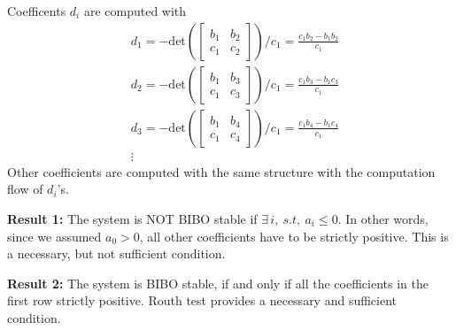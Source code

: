 \documentclass[twoside]{article}
\begin{document}
Coefficents $d_i$ are computed with
%
\begin{align*}
& d_1 = - \mathrm{det}\left( \left[ \begin{array}{cc} b_1 & b_2 \\ 
                                      c_1 & c_2 \end{array}
                                                           \right]
                                                           \right) /c_1
=
\frac{c_1 b_2 - b_1 b_2 }{c_1}
\\
&d_2 = - \mathrm{det}\left( \left[ \begin{array}{cc} b_1 & b_3 \\ c_1
                                                         &
                                                           c_3 \end{array}
                                                           \right]
                                                           \right) / c_1
=
\frac{c_1 b_3 - b_1 c_3 }{c_1}
\\
&d_3 = - \mathrm{det}\left( \left[ \begin{array}{cc} b_1 & b_4 \\ c_1
                                                         &
                                                           c_4 \end{array}
                                                           \right]
                                                           \right) / c_1
=
\frac{c_1 b_4 - b_1 c_4 }{c_1}
\\
&\vdots
\end{align*}  
%
Other coefficients are computed with the same structure with the
computation flow of $d_i$'s. 

\textbf{Result 1:} The system is NOT BIBO stable if $\exists \, i , \ s.t ,\
a_i \leq 0 $. In other words, since we assumed $a_0 > 0$, all other
coefficients have to be strictly positive. This is a necessary, but
not sufficient condition. 

\textbf{Result 2:} The system is BIBO stable, if and only if all the 
coefficients in the first row strictly positive. Routh test provides
a necessary and sufficient condition.  
\end{document}
